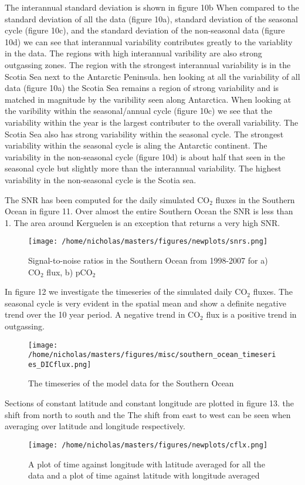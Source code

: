 \documentclass[11pt, a4paper]{article}
\numberwithin{figure}{section}
\numberwithin{table}{section}
\begin{document}
The interannual standard deviation is shown in figure 10b
When compared to the
standard deviation of all the data (figure 10a), standard deviation of the
seasonal cycle (figure 10c), and the standard deviation of the non-seasonal data
(figure 10d) we can see that interannual variability contributes greatly to the 
variablity in the data.
The regions with high interannual varibility are also 
strong outgassing zones. The region with the strongest interannual variability 
is in the Scotia Sea next to the Antarctic Peninsula.
hen looking at all the variability of all data (figure 10a) the Scotia Sea 
remains a region of strong variability
and is matched in magnitude by the varibility seen along Antarctica.
When looking at the varibility within the seasonal/annual cycle (figure 10c) 
we see that the
variability within the year is the largest contributer to the overall variability.
The Scotia Sea also has strong variability within the seasonal cycle.
The strongest variability within the seasonal cycle is aling the Antarctic continent.
The variability in the non-seasonal cycle (figure 10d) is about half that seen in the 
seasonal cycle but slightly more than the interannual variability. The highest 
variability in the non-seasonal cycle is the Scotia sea.

The SNR has been computed for the daily simulated CO$_2$ fluxes in the Southern Ocean
in figure 11. Over almost the entire Southern Ocean the SNR is less than 1.
The area around Kerguelen is an exception that returns a very high SNR.
  \begin{figure}[H]
    \caption{Signal-to-noise ratios in the  Southern Ocean from 1998-2007 for a) CO$_2$ flux,
	b) pCO$_2$}
  \centering
    \texttt{[image: /home/nicholas/masters/figures/newplots/snrs.png]}
  \end{figure}

In figure 12 we investigate the timeseries of the simulated daily CO$_2$ fluxes.
The seasonal cycle is very evident in the spatial mean and show a definite negative trend
over the 10 year period. A negative trend in CO$_2$ flux is a positive trend in outgassing.
 \begin{figure}[H]
    \caption{The timeseries of the model data for the Southern Ocean}
  \centering
    \texttt{[image: /home/nicholas/masters/figures/misc/southern\_ocean\_timeseries\_DICflux.png]}
  \end{figure}
  
Sections of constant latitude and constant longitude are plotted in figure 13. 
the shift from north to south and the
The shift from east to west can be seen when averaging over latitude and longitude 
respectively.
  \begin{figure}[hhtbp]
    \caption{A plot of time against longitude with latitude 
              averaged for all the data and a plot of time against latitude with longitude 
                averaged}
  \centering
    \texttt{[image: /home/nicholas/masters/figures/newplots/cflx.png]}
  \end{figure}
\end{document}
